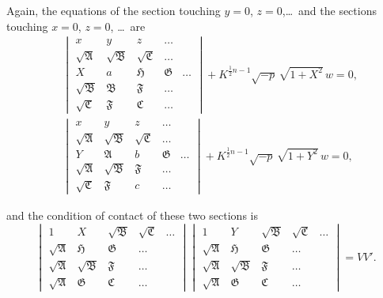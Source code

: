 \documentclass[11pt,a4paper]{book}
\begin{document}
Again, the equations of the section touching $y=0$, $z=0$,\ldots\ and the sections touching $x=0$, $z=0$, \ldots\ are
\begin{align*}
&\begin{vmatrix}
x & y & z & \ldots \\
\sqrt{\mathfrak{A}} & \sqrt{\mathfrak{B}} & \sqrt{\mathfrak{C}} & \ldots \\
X & a & \mathfrak{H} & \mathfrak{G} & \ldots \\
\sqrt{\mathfrak{B}} & \mathfrak{B} & \mathfrak{F} & \ldots \\
\sqrt{\mathfrak{C}} & \mathfrak{F} & \mathfrak{C} & \ldots
\end{vmatrix}
+ K^{\frac{1}{2}n-1}\sqrt{-p}\,\sqrt{1+X^2}\,w = 0,\\
&\begin{vmatrix}
x & y & z & \ldots \\
\sqrt{\mathfrak{A}} & \sqrt{\mathfrak{B}} & \sqrt{\mathfrak{C}} & \ldots \\
Y & \mathfrak{A} & b & \mathfrak{G} & \ldots \\
\sqrt{\mathfrak{A}} & \sqrt{\mathfrak{B}} & \mathfrak{F} & \ldots \\
\sqrt{\mathfrak{C}} & \mathfrak{F} & c & \ldots
\end{vmatrix}
+ K^{\frac{1}{2}n-1}\sqrt{-p}\,\sqrt{1+Y^2}\,w = 0,
\end{align*}

\newpage
\setcounter{page}{86}

and the condition of contact of these two sections is
\[
\begin{vmatrix}
1 & X & \sqrt{\mathfrak{B}} & \sqrt{\mathfrak{C}} & \ldots \\
\sqrt{\mathfrak{A}} & \mathfrak{H} & \mathfrak{G} & \ldots \\
\sqrt{\mathfrak{A}} & \sqrt{\mathfrak{B}} & \mathfrak{F} & \ldots \\
\sqrt{\mathfrak{A}} & \mathfrak{G} & \mathfrak{C} & \ldots
\end{vmatrix}
\begin{vmatrix}
1 & Y & \sqrt{\mathfrak{B}} & \sqrt{\mathfrak{C}} & \ldots \\
\sqrt{\mathfrak{A}} & \mathfrak{H} & \mathfrak{G} & \ldots \\
\sqrt{\mathfrak{A}} & \sqrt{\mathfrak{B}} & \mathfrak{F} & \ldots \\
\sqrt{\mathfrak{A}} & \mathfrak{G} & \mathfrak{C} & \ldots
\end{vmatrix}
= VV'.
\]
\end{document}
